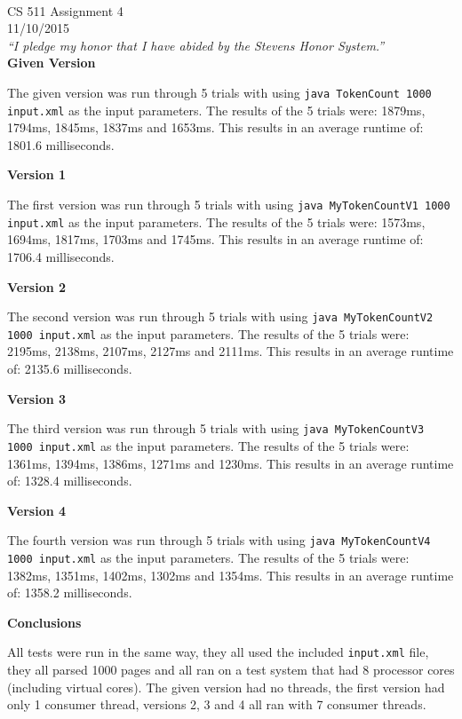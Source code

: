 \documentclass[11pt, letterpaper]{article}
\newcommand{\myheader}[2]
{\noindent{Bradford Smith (bsmith8)}\\
    #1 \\
    #2 \\
    \textit{``I pledge my honor that I have abided by the Stevens Honor System.''}\\
}
\newcommand{\code}[1]{\texttt{#1}}
\begin{document}
\myheader{CS 511 Assignment 4}{11/10/2015}

\bigskip
\noindent\textbf{Given Version}

The given version was run through 5 trials with using \code{java TokenCount 1000 input.xml} as the input parameters. The results of the 5 trials were: 1879ms, 1794ms, 1845ms, 1837ms and 1653ms. This results in an average runtime of: 1801.6 milliseconds.

\bigskip
\noindent\textbf{Version 1}

The first version was run through 5 trials with using \code{java MyTokenCountV1 1000 input.xml} as the input parameters. The results of the 5 trials were: 1573ms, 1694ms, 1817ms, 1703ms and 1745ms. This results in an average runtime of: 1706.4 milliseconds.

\bigskip
\noindent\textbf{Version 2}

The second version was run through 5 trials with using \code{java MyTokenCountV2 1000 input.xml} as the input parameters. The results of the 5 trials were: 2195ms, 2138ms, 2107ms, 2127ms and 2111ms. This results in an average runtime of: 2135.6 milliseconds.

\bigskip
\noindent\textbf{Version 3}

The third version was run through 5 trials with using \code{java MyTokenCountV3 1000 input.xml} as the input parameters. The results of the 5 trials were: 1361ms, 1394ms, 1386ms, 1271ms and 1230ms. This results in an average runtime of: 1328.4 milliseconds.

\bigskip
\noindent\textbf{Version 4}

The fourth version was run through 5 trials with using \code{java MyTokenCountV4 1000 input.xml} as the input parameters. The results of the 5 trials were: 1382ms, 1351ms, 1402ms, 1302ms and 1354ms. This results in an average runtime of: 1358.2 milliseconds.

\bigskip
\noindent\textbf{Conclusions}

All tests were run in the same way, they all used the included \code{input.xml} file, they all parsed 1000 pages and all ran on a test system that had 8 processor cores (including virtual cores). The given version had no threads, the first version had only 1 consumer thread, versions 2, 3 and 4 all ran with 7 consumer threads.
\end{document}

